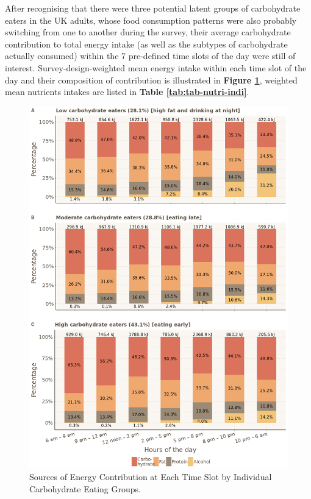 After recognising that there were three potential latent groups of carbohydrate eaters in the UK adults, whose food consumption patterns were also probably switching from one to another during the survey, their average carbohydrate contribution to total energy intake (as well as the subtypes of carbohydrate actually consumed) within the 7 pre-defined time slots of the day were still of interest. Survey-design-weighted mean energy intake within each time slot of the day and their composition of contribution is illustrated in \textbf{Figure \ref{fig:energysourcesCB}}, weighted mean nutrients intakes are listed in \textbf{Table \ref{tab:tab-nutri-indi}}.

\begin{figure}[H]
	\centering
	\includegraphics[width=13cm]{Figures/CBenergysources.png}
	\decoRule
	\caption[Sources of Energy Contribution at Each Time Slot by Individual Carbohydrate Eating Groups.]{Sources of Energy Contribution at Each Time Slot by Individual Carbohydrate Eating Groups.}
	\label{fig:energysourcesCB}
\end{figure}
\vspace{-0.6cm}

